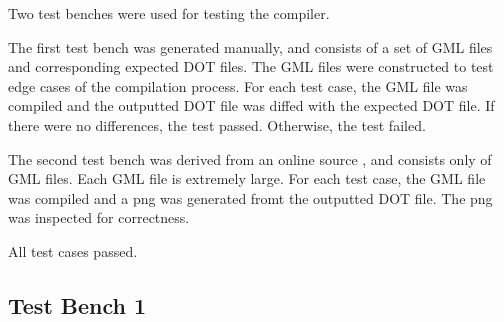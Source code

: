 \documentclass[a4paper]{report}
\begin{document}
Two test benches were used for testing the compiler. 

The first test bench was generated manually, and consists of a set of GML files and corresponding expected DOT files. The GML files were constructed to test edge cases of the compilation process. For each test case, the GML file was compiled and the outputted DOT file was diffed with the expected DOT file. If there were no differences, the test passed. Otherwise, the test failed.

The second test bench was derived from an online source \cite{TESTBENCH2}, and consists only of GML files. Each GML file is extremely large. For each test case, the GML file was compiled and a png was generated fromt the outputted DOT file. The png was inspected for correctness.

All test cases passed.
\newpage
\subsection{Test Bench 1}
\end{document}
